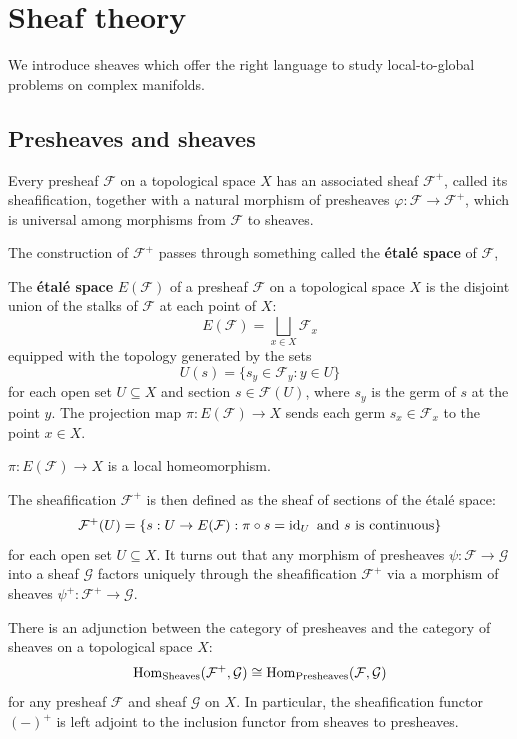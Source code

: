\documentclass[12pt]{article}
\begin{document}
\section{Sheaf theory}
We introduce sheaves which offer the right language to study local-to-global problems on complex manifolds.
\subsection{Presheaves and sheaves}
Every presheaf $\mathcal{F}$ on a topological space $X$ has an associated sheaf $\mathcal{F}^+$, called its sheafification,
together with a natural morphism of presheaves $\varphi: \mathcal{F} \to \mathcal{F}^+$,
which is universal among morphisms from $\mathcal{F}$ to sheaves.

The construction of $\mathcal{F}^+$ passes through something called the \textbf{étalé space} of $\mathcal{F}$,

\begin{definition}
The \textbf{étalé space} $E(\mathcal{F})$ of a presheaf $\mathcal{F}$ on a topological space $X$ is the disjoint union of the stalks of $\mathcal{F}$ at each point of $X$:
\[E(\mathcal{F}) = \bigsqcup_{x \in X} \mathcal{F}_x\]
equipped with the topology generated by the sets
\[U(s) = \{ s_y \in \mathcal{F}_y : y \in U \}\]
for each open set $U \subseteq X$ and section $s \in \mathcal{F}(U)$,
where $s_y$ is the germ of $s$ at the point $y$. The projection map $\pi: E(\mathcal{F}) \to X$ sends each germ $s_x \in \mathcal{F}_x$ to the point $x \in X$.
\end{definition}

\begin{proposition}
    $\pi : E(\mathcal{F}) \to X$ is a local homeomorphism.
\end{proposition}

The sheafification $\mathcal{F}^+$ is then defined as the sheaf of sections of the étalé space:
\[\mathcal{F}^+(U) = \{ s: U \to E(\mathcal{F}) : \pi \circ s = \operatorname{id}_U \text{ and } s \text{ is continuous} \}\]
for each open set $U \subseteq X$. It turns out that any morphism of presheaves $\psi: \mathcal{F} \to \mathcal{G}$ into a sheaf $\mathcal{G}$ factors uniquely through the sheafification $\mathcal{F}^+$ via a morphism of sheaves $\psi^+: \mathcal{F}^+ \to \mathcal{G}$.

\begin{theorem}
    There is an adjunction between the category of presheaves and the category of sheaves on a topological space $X$:
    \[\operatorname{Hom}_{\text{Sheaves}}(\mathcal{F}^+, \mathcal{G}) \cong \operatorname{Hom}_{\text{Presheaves}}(\mathcal{F}, \mathcal{G})\]
    for any presheaf $\mathcal{F}$ and sheaf $\mathcal{G}$ on $X$. In particular, the sheafification functor $(-)^+$ is left adjoint to the inclusion functor from sheaves to presheaves.
\end{theorem}
\end{document}
